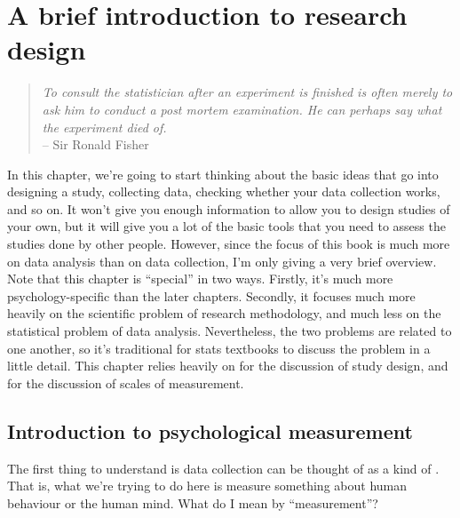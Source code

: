 

\chapter{A brief introduction to research design\label{ch:studydesign}}

\begin{quote}
{\it To consult the statistician after an experiment is finished is often merely to ask him to conduct a post mortem examination. He can perhaps say what the experiment died of.}\\
\hspace*{2cm} -- Sir Ronald Fisher
\end{quote}

In this chapter, we're going to start thinking about the basic ideas that go into designing a study, collecting data, checking whether your data collection works, and so on. It won't give you enough information to allow you to design studies of your own, but it will give you a lot of the basic tools that you need to assess the studies done by other people. However, since the focus of this book is much more on data analysis than on data collection, I'm only giving a very brief overview. Note that this chapter is ``special'' in two ways. Firstly, it's much more psychology-specific than the later chapters. Secondly, it focuses much more heavily on the scientific problem of research methodology, and much less on the statistical problem of data analysis. Nevertheless, the two problems are related to one another, so it's traditional for stats textbooks to discuss the problem in a little detail. This chapter relies heavily on \textcite{Campbell1963} for the discussion of study design, and \textcite{Stevens1946} for the discussion of scales of measurement. 

\section{Introduction to psychological measurement~\label{sec:measurement}}

The first thing to understand is data collection can be thought of as a kind of . That is, what we're trying to do here is measure something about human behaviour or the human mind. What do I mean by ``measurement''? 

